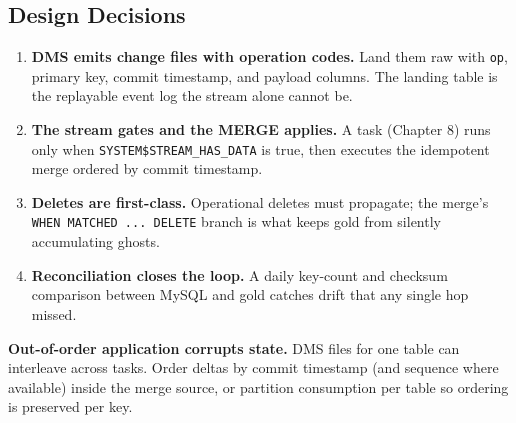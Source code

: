 \subsection{Design Decisions}
\begin{enumerate}
    \item \textbf{DMS emits change files with operation codes.} Land them raw with \texttt{op}, primary key, commit timestamp, and payload columns. The landing table is the replayable event log the stream alone cannot be.
    \item \textbf{The stream gates and the MERGE applies.} A task (Chapter 8) runs only when \texttt{SYSTEM\$STREAM\_HAS\_DATA} is true, then executes the idempotent merge ordered by commit timestamp.
    \item \textbf{Deletes are first-class.} Operational deletes must propagate; the merge's \texttt{WHEN MATCHED ... DELETE} branch is what keeps gold from silently accumulating ghosts.
    \item \textbf{Reconciliation closes the loop.} A daily key-count and checksum comparison between MySQL and gold catches drift that any single hop missed.
\end{enumerate}

\begin{pitfall}
\textbf{Out-of-order application corrupts state.} DMS files for one table can interleave across tasks. Order deltas by commit timestamp (and sequence where available) inside the merge source, or partition consumption per table so ordering is preserved per key.
\end{pitfall}

